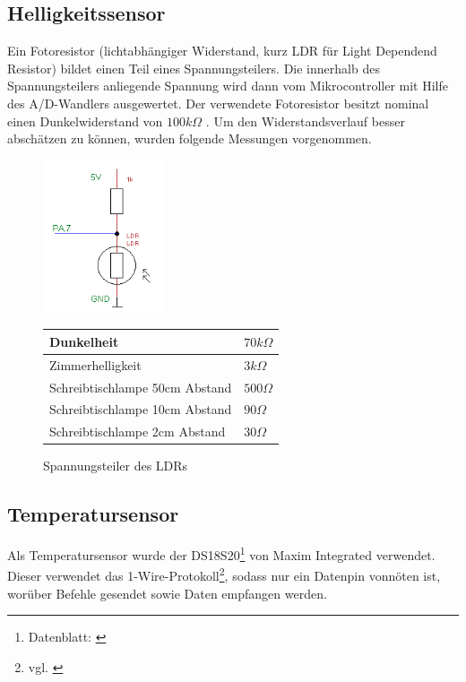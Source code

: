 \subsection{Helligkeitssensor}
Ein Fotoresistor (lichtabhängiger Widerstand, kurz LDR für Light Dependend Resistor) bildet einen Teil eines Spannungsteilers. Die innerhalb des Spannungsteilers anliegende Spannung wird dann vom Mikrocontroller mit Hilfe des A/D-Wandlers ausgewertet.
Der verwendete Fotoresistor besitzt nominal einen Dunkelwiderstand von $100 k\Omega$ .
Um den Widerstandsverlauf besser abschätzen zu können, wurden folgende Messungen vorgenommen.
\begin{figure}[h]
  \begin{center}
  \begin{minipage}[b]{0.3\textwidth}
        \includegraphics[height=4.5cm]{skizzen/helligkeitssensor_schmatic.png}
        \caption{Spannungsteiler des LDRs}
  \end{minipage}
  \hspace{0.07\textwidth} 
  \begin{minipage}[b]{0.6\textwidth}
    \begin{tabular}[h]{||l | l||}
	  \hline \hline
	  Dunkelheit& $70 k\Omega$ \\ \hline
	  Zimmerhelligkeit & $3 k\Omega$ \\ \hline
	  Schreibtischlampe 50cm Abstand& $500 \Omega$ \\ \hline
	  Schreibtischlampe 10cm Abstand& $90 \Omega$ \\ \hline
	  Schreibtischlampe 2cm Abstand& $30 \Omega$  \\
	  \hline\hline
    \end{tabular} 
    \label{Modellversuch} 
  \end{minipage}
  \end{center}
\end{figure}
%
\subsection{Temperatursensor}
Als Temperatursensor wurde der DS18S20\footnote{Datenblatt: \cite{ds18s20}} von
Maxim Integrated verwendet. Dieser verwendet das
1-Wire\textsuperscript{\textregistered}-Protokoll\footnote{vgl. \cite{1wire}},
sodass nur ein Datenpin vonnöten ist, worüber Befehle gesendet sowie Daten empfangen werden.

